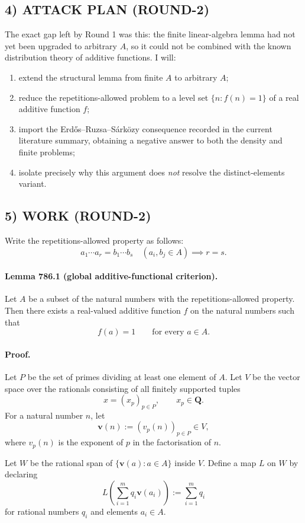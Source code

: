 \subsection*{4) ATTACK PLAN (ROUND-2)}
The exact gap left by Round 1 was this: the finite linear-algebra lemma had not yet been upgraded to arbitrary $A$, so it could not be combined with the known distribution theory of additive functions. I will:
\begin{enumerate}
\item extend the structural lemma from finite $A$ to arbitrary $A$;
\item reduce the repetitions-allowed problem to a level set $\{n : f(n)=1\}$ of a real additive function $f$;
\item import the Erd\H{o}s--Ruzsa--S\'ark\"ozy consequence recorded in the current literature summary, obtaining a negative answer to both the density and finite problems;
\item isolate precisely why this argument does \emph{not} resolve the distinct-elements variant.
\end{enumerate}

\subsection*{5) WORK (ROUND-2)}
Write the repetitions-allowed property as follows:
\[
 a_1 \cdots a_r = b_1 \cdots b_s \quad (a_i,b_j \in A)
 \implies r=s.
\]

\paragraph{Lemma 786.1 (global additive-functional criterion).}
Let $A$ be a subset of the natural numbers with the repetitions-allowed property. Then there exists a real-valued additive function $f$ on the natural numbers such that
\[
 f(a)=1 \qquad \text{for every } a \in A.
\]

\paragraph{Proof.}
Let $P$ be the set of primes dividing at least one element of $A$. Let $V$ be the vector space over the rationals consisting of all finitely supported tuples
\[
 x=(x_p)_{p \in P}, \qquad x_p \in \mathbf Q.
\]
For a natural number $n$, let
\[
 \mathbf v(n) := (v_p(n))_{p \in P} \in V,
\]
where $v_p(n)$ is the exponent of $p$ in the factorisation of $n$.

Let $W$ be the rational span of $\{\mathbf v(a): a \in A\}$ inside $V$. Define a map $L$ on $W$ by declaring
\[
 L\!\left(\sum_{i=1}^m q_i \mathbf v(a_i)\right) := \sum_{i=1}^m q_i
\]
for rational numbers $q_i$ and elements $a_i \in A$.

